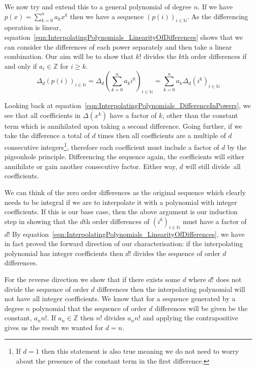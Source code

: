 \begin{parts}
\begin{solution}
		We now try and extend this to a general polynomial of degree $n$. If we have $p(x) = \sum_{k=0}^n a_k x^k$ then we have a sequence $(p(i))_{i \in \mathbb{N}}$. As the differencing operation is linear, equation~\eqref{eqn:InterpolatingPolynomials_LinearityOfDifferences} shows that we can consider the differences of each power separately and then take a linear combination. Our aim will be to show that $k!$ divides the $k$th order differences if and only if $a_i \in \mathbb{Z}$ for $i \ge k$.
		\begin{equation}
			\Delta_d (p(i))_{i \in \mathbb{N}} = \Delta_d \left( \sum_{k=0}^n a_k i^k \right)_{i \in \mathbb{N}} = \sum_{k=0}^n a_k\Delta_d (i^k)_{i \in \mathbb{N}}
			\label{eqn:InterpolatingPolynomials_LinearityOfDifferences}
		\end{equation}
		
		Looking back at equation~\ref{eqn:InterpolatingPolynomials_DifferenceInPowers}, we see that all coefficients in $\Delta (x^k)$ have a factor of $k$, other than the constant term which is annihilated upon taking a second difference. Going further, if we take the difference a total of $d$ times then all coefficients are a multiple of $d$ consecutive integers\footnote{If $d=1$ then this statement is also true meaning we do not need to worry about the presence of the constant term in the first difference.}, therefore each coefficient must include a factor of $d$ by the pigeonhole principle. Differencing the sequence again, the coefficients will either annihilate or gain another consecutive factor. Either way, $d$ will still divide~all coefficients.
		
		We can think of the zero order differences as the original sequence which clearly needs to be integral if we are to interpolate it with a polynomial with integer coefficients. If this is our base case, then the above argument is our induction step in showing that the $d$th order differences of $(i^k)_{i \in \mathbb{N}}$ must have a factor of $d!$ By equation~\eqref{eqn:InterpolatingPolynomials_LinearityOfDifferences}, we have in fact proved the forward direction of our characterisation: if the interpolating polynomial has integer coefficients then $d!$ divides the sequence of order $d$ differences.
		
		For the reverse direction we show that if there exists some $d$ where $d!$ does not divide the sequence of order $d$ differences then the interpolating polynomial will not have all integer coefficients. We know that for a sequence generated by a degree $n$ polynomial that the sequence of order $d$ differences will be given be the constant, $a_n n!$. If $a_n \in \mathbb{Z}$ then $n!$ divides $a_n n!$ and applying the contrapositive gives us the result we wanted for $d = n$.
		

\end{solution}
\end{parts}
